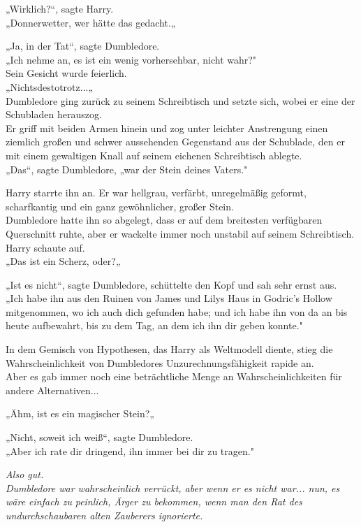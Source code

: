 {„Wirklich?“, sagte Harry.\\ „Donnerwetter, wer hätte das gedacht.„

„Ja, in der Tat“, sagte Dumbledore.\\ „Ich nehme an, es ist ein wenig vorhersehbar, nicht wahr?"\\ Sein Gesicht wurde feierlich.\\ „Nichtsdestotrotz...„\\ Dumbledore ging zurück zu seinem Schreibtisch und setzte sich, wobei er eine der Schubladen herauszog.\\ Er griff mit beiden Armen hinein und zog unter leichter Anstrengung einen ziemlich großen und schwer aussehenden Gegenstand aus der Schublade, den er mit einem gewaltigen Knall auf seinem eichenen Schreibtisch ablegte.\\ „Das“, sagte Dumbledore, „war der Stein deines Vaters."

Harry starrte ihn an. Er war hellgrau, verfärbt, unregelmäßig geformt, scharfkantig und ein ganz gewöhnlicher, großer Stein.\\ Dumbledore hatte ihn so abgelegt, dass er auf dem breitesten verfügbaren Querschnitt ruhte, aber er wackelte immer noch unstabil auf seinem Schreibtisch.\\ Harry schaute auf.\\ „Das ist ein Scherz, oder?„

„Ist es nicht“, sagte Dumbledore, schüttelte den Kopf und sah sehr ernst aus.\\ „Ich habe ihn aus den Ruinen von James und Lilys Haus in Godric's Hollow mitgenommen, wo ich auch dich gefunden habe; und ich habe ihn von da an bis heute aufbewahrt, bis zu dem Tag, an dem ich ihn dir geben konnte."

In dem Gemisch von Hypothesen, das Harry als Weltmodell diente, stieg die Wahrscheinlichkeit von Dumbledores Unzurechnungsfähigkeit rapide an.\\ Aber es gab immer noch eine beträchtliche Menge an Wahrscheinlichkeiten für andere Alternativen...

„Ähm, ist es ein magischer Stein?„

„Nicht, soweit ich weiß“, sagte Dumbledore.\\ „Aber ich rate dir dringend, ihn immer bei dir zu tragen."

\emph{Also gut.\\ Dumbledore war wahrscheinlich verrückt, aber wenn er es nicht war... nun, es wäre einfach zu} \emph{peinlich, Ärger zu bekommen, wenn man den Rat des undurchschaubaren alten Zauberers ignorierte.}

}

